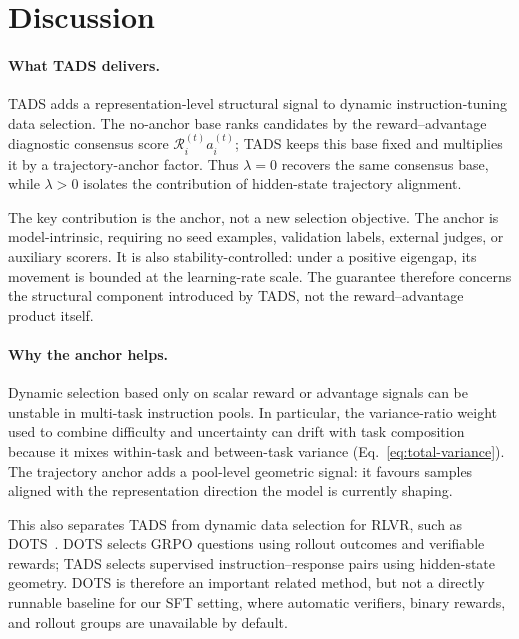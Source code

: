 \section{Discussion}
\label{sec:discussion}

\paragraph{What TADS delivers.}
\textsc{TADS} adds a representation-level structural signal to
dynamic instruction-tuning data selection. The no-anchor base ranks
candidates by the reward--advantage diagnostic consensus score
$\mathcal{R}_i^{(t)}a_i^{(t)}$; \textsc{TADS} keeps this base fixed
and multiplies it by a trajectory-anchor factor. Thus
$\lambda=0$ recovers the same consensus base, while $\lambda>0$
isolates the contribution of hidden-state trajectory alignment.

The key contribution is the anchor, not a new selection objective. The
anchor is model-intrinsic, requiring no seed examples, validation
labels, external judges, or auxiliary scorers. It is also
stability-controlled: under a positive eigengap, its movement is
bounded at the learning-rate scale. The guarantee therefore concerns
the structural component introduced by \textsc{TADS}, not the
reward--advantage product itself.

\paragraph{Why the anchor helps.}
Dynamic selection based only on scalar reward or advantage signals can
be unstable in multi-task instruction pools. In particular, the
variance-ratio weight used to combine difficulty and uncertainty can
drift with task composition because it mixes within-task and
between-task variance (Eq.~\ref{eq:total-variance}). The trajectory
anchor adds a pool-level geometric signal: it favours samples aligned
with the representation direction the model is currently shaping.

This also separates \textsc{TADS} from dynamic data selection for
RLVR, such as DOTS~\cite{sun2025dots}. DOTS selects GRPO questions
using rollout outcomes and verifiable rewards; \textsc{TADS}
selects supervised instruction--response pairs using hidden-state
geometry. DOTS is therefore an important related method, but not a
directly runnable baseline for our SFT setting, where automatic
verifiers, binary rewards, and rollout groups are unavailable by
default.

